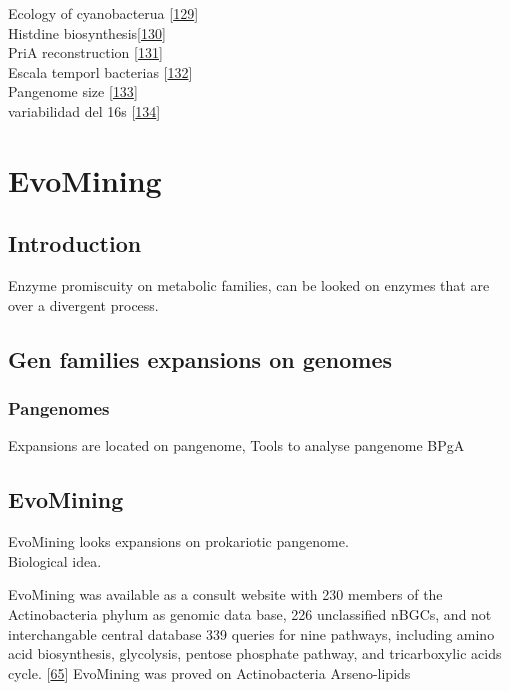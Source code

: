 \documentclass[12pt,twoside]{reedthesis}
\begin{document}
  Ecology of cyanobacterua
  {[}\protect\hyperlink{ref-whittonux5fecologyux5f2012}{129}{]}\\
  Histdine
  biosynthesis{[}\protect\hyperlink{ref-cohenux5fbiosynthesisux5f2004}{130}{]}\\
  PriA reconstruction
  {[}\protect\hyperlink{ref-plachux5flong-termux5f2016}{131}{]}\\
  Escala temporl bacterias
  {[}\protect\hyperlink{ref-battistuzziux5fgenomicux5f2004}{132}{]}\\
  Pangenome size
  {[}\protect\hyperlink{ref-lapierreux5festimatingux5f2009}{133}{]}\\
  variabilidad del 16s
  {[}\protect\hyperlink{ref-vetrovskyux5fvariabilityux5f2013}{134}{]}
  
  \chapter{EvoMining}\label{rmd-basics}
  
  \section{Introduction}\label{introduction-1}
  
  Enzyme promiscuity on metabolic families, can be looked on enzymes that
  are over a divergent process.
  
  \section{Gen families expansions on
  genomes}\label{gen-families-expansions-on-genomes}
  
  \subsection{Pangenomes}\label{pangenomes}
  
  Expansions are located on pangenome, Tools to analyse pangenome BPgA
  
  \section{EvoMining}\label{evomining-1}
  
  EvoMining looks expansions on prokariotic pangenome.\\
  Biological idea.
  
  EvoMining was available as a consult website with 230 members of the
  Actinobacteria phylum as genomic data base, 226 unclassified nBGCs, and
  not interchangable central database 339 queries for nine pathways,
  including amino acid biosynthesis, glycolysis, pentose phosphate
  pathway, and tricarboxylic acids cycle.
  {[}\protect\hyperlink{ref-cruz-moralesux5fphylogenomicux5f2016}{65}{]}
  EvoMining was proved on Actinobacteria Arseno-lipids
  
\end{document}

